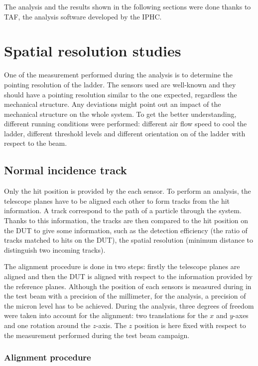    The analysis and the results shown in the following sections were done thanks to \gls{TAF}, the analysis software developed by the IPHC.

  \section{Spatial resolution studies}
   
    One of the measurement performed during the analysis is to determine the pointing resolution of the ladder.
    The sensors used are well-known and they should have a pointing resolution similar to the one expected, regardless the mechanical structure.
    Any deviations might point out an impact of the mechanical structure on the whole system.
    To get the better understanding, different running conditions were performed: different air flow speed to cool the ladder, different threshold levels and different orientation on of the ladder with respect to the beam.

    \subsection{Normal incidence track}

    Only the hit position is provided by the each sensor.
    To perform an analysis, the telescope planes have to be aligned each other to form tracks from the hit information.
    A track correspond to the path of a particle through the system.
    Thanks to this information, the tracks are then compared to the hit position on the \gls{DUT} to give some information, such as the detection efficiency (the ratio of tracks matched to hits on the \gls{DUT}), the spatial resolution (minimum distance to distinguish two incoming tracks).

    The alignment procedure is done in two steps: firstly the telescope planes are aligned and then the \gls{DUT} is aligned with respect to the information provided by the reference planes. 
    Although the position of each sensors is measured during in the test beam with a precision of the millimeter, for the analysis, a precision of the micron level has to be achieved.
    During the analysis, three degrees of freedom were taken into account for the alignment: two translations for the $x$ and $y$-axes and one rotation around the $z$-axis.
    The $z$ position is here fixed with respect to the measurement performed during the test beam campaign.

      \subsubsection{Alignment procedure}

